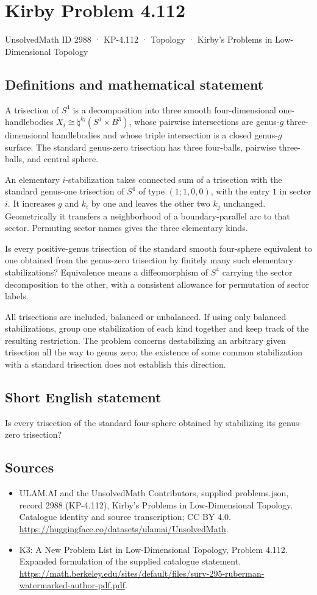 \documentclass[11pt,a4paper]{article}
\begin{document}
\section*{Kirby Problem 4.112}\label{2988}
{\small UnsolvedMath ID 2988 · KP-4.112 · Topology · Kirby's Problems in Low-Dimensional Topology}
\subsection{Definitions and mathematical statement}
A trisection of $S^4$ is a decomposition into three smooth four-dimensional one-handlebodies $X_i\cong\natural^{k_i}(S^1\times B^3)$, whose pairwise intersections are genus-$g$ three-dimensional handlebodies and whose triple intersection is a closed genus-$g$ surface. The standard genus-zero trisection has three four-balls, pairwise three-balls, and central sphere.

An elementary $i$-stabilization takes connected sum of a trisection with the standard genus-one trisection of $S^4$ of type $(1;1,0,0)$, with the entry $1$ in sector $i$. It increases $g$ and $k_i$ by one and leaves the other two $k_j$ unchanged. Geometrically it transfers a neighborhood of a boundary-parallel arc to that sector. Permuting sector names gives the three elementary kinds.

Is every positive-genus trisection of the standard smooth four-sphere equivalent to one obtained from the genus-zero trisection by finitely many such elementary stabilizations? Equivalence means a diffeomorphism of $S^4$ carrying the sector decomposition to the other, with a consistent allowance for permutation of sector labels.

All trisections are included, balanced or unbalanced. If using only balanced stabilizations, group one stabilization of each kind together and keep track of the resulting restriction. The problem concerns destabilizing an arbitrary given trisection all the way to genus zero; the existence of some common stabilization with a standard trisection does not establish this direction.
\subsection{Short English statement}
Is every trisection of the standard four-sphere obtained by stabilizing its genus-zero trisection?
\subsection{Sources}
\begin{itemize}
\item[S1] ULAM.AI and the UnsolvedMath Contributors, supplied problems.json, record 2988 (KP-4.112), Kirby's Problems in Low-Dimensional Topology. Catalogue identity and source transcription; CC BY 4.0.
\url{https://huggingface.co/datasets/ulamai/UnsolvedMath}.
\item[S2] K3: A New Problem List in Low-Dimensional Topology, Problem 4.112. Expanded formulation of the supplied catalogue statement.
\url{https://math.berkeley.edu/sites/default/files/surv-295-ruberman-watermarked-author-pdf.pdf}.
\end{itemize}
\end{document}
